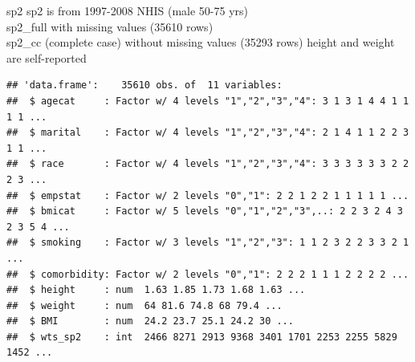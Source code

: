 \documentclass[
  ignorenonframetext,
]{beamer}
\begin{document}
\begin{frame}[fragile]{sp2}
\label{sp2}
sp2 is from 1997-2008 NHIS (male 50-75 yrs)\\
sp2\_full with missing values (35610 rows)\\
sp2\_cc (complete case) without missing values (35293 rows) height and
weight are self-reported

\begin{verbatim}
## 'data.frame':    35610 obs. of  11 variables:
##  $ agecat     : Factor w/ 4 levels "1","2","3","4": 3 1 3 1 4 4 1 1 1 1 ...
##  $ marital    : Factor w/ 4 levels "1","2","3","4": 2 1 4 1 1 2 2 3 1 1 ...
##  $ race       : Factor w/ 4 levels "1","2","3","4": 3 3 3 3 3 3 2 2 2 3 ...
##  $ empstat    : Factor w/ 2 levels "0","1": 2 2 1 2 2 1 1 1 1 1 ...
##  $ bmicat     : Factor w/ 5 levels "0","1","2","3",..: 2 2 3 2 4 3 2 3 5 4 ...
##  $ smoking    : Factor w/ 3 levels "1","2","3": 1 1 2 3 2 2 3 3 2 1 ...
##  $ comorbidity: Factor w/ 2 levels "0","1": 2 2 2 1 1 1 2 2 2 2 ...
##  $ height     : num  1.63 1.85 1.73 1.68 1.63 ...
##  $ weight     : num  64 81.6 74.8 68 79.4 ...
##  $ BMI        : num  24.2 23.7 25.1 24.2 30 ...
##  $ wts_sp2    : int  2466 8271 2913 9368 3401 1701 2253 2255 5829 1452 ...
\end{verbatim}
\end{frame}
\end{document}
